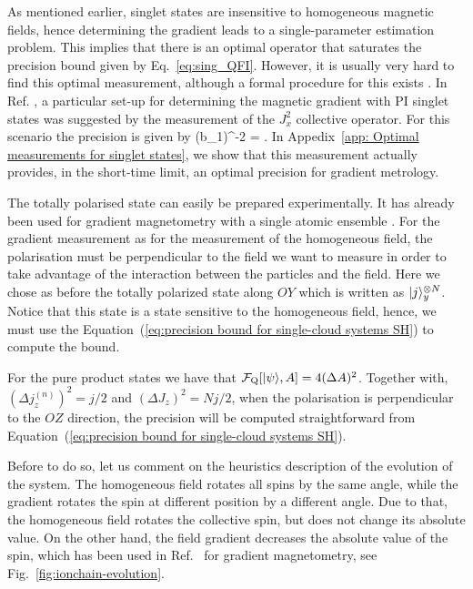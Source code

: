 As mentioned earlier, singlet states are insensitive
to homogeneous magnetic fields,
hence determining the gradient leads to a single-parameter
estimation problem.
This implies that there is an optimal operator that saturates the precision
bound given by Eq.~\eqref{eq:sing_QFI}.
However, it is usually very hard to find
this optimal measurement,
although a formal procedure for this exists \cite{Paris2009}.
In Ref. \cite{Urizar-Lanz2013}, a particular set-up for determining the magnetic gradient
with PI singlet states was suggested by the measurement
of the $J_x^2$ collective operator.
 For this scenario the precision is given by
\be
\label{eq: Jx2_acc}
(\Delta b_1)^{-2}
= .
\ee
In Appedix~\ref{app: Optimal measurements for singlet states},
we  show that this measurement actually provides,
in the short-time limit, an optimal precision for gradient metrology.


The totally polarised state can easily be prepared experimentally.
It has already been used for gradient magnetometry with a single atomic ensemble \cite{Koschorreck2011,Vengalattore2007}.
For the gradient measurement as for the measurement of the homogeneous field, the polarisation must be perpendicular to the field we want to measure in order to take advantage of the interaction between the particles and the field.
Here we chose as before the totally polarized state along $OY$ which is written as $\vert j \rangle_y^{\otimes N}$.
Notice that this state is a state sensitive to the homogeneous field, hence, we must use the Equation~(\ref{eq:precision bound for single-cloud systems SH}) to compute the bound.

For the pure product states we have that $\mathcal{F}_{\text{Q}}[\vert \psi \rangle, A] = 4(\Delta A)^2$.
Together with,
$(\Delta j_z^{(n)})^2=j/2$ and $(\Delta J_z)^2=Nj/2$, when the polarisation is
perpendicular to the $OZ$ direction, the precision will be computed straightforward from Equation~(\ref{eq:precision bound for single-cloud systems SH}).

Before to do so, let us comment on the heuristics description of the evolution of the system.
The homogeneous field rotates all spins by the same angle, while the gradient rotates the spin at different position by a different angle.
Due to that, the homogeneous field rotates the collective spin, but does not change its absolute value.
On the other hand, the field gradient decreases the absolute value of the spin, which has been used in Ref.~\cite{Behbood2013} for gradient magnetometry, see Fig.~\ref{fig:ionchain-evolution}.

